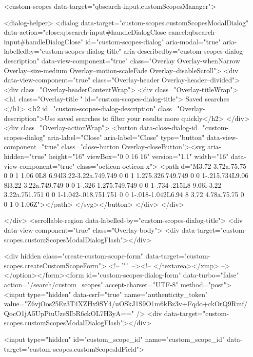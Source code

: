     <custom-scopes data-target="qbsearch-input.customScopesManager">
    
<dialog-helper>
  <dialog data-target="custom-scopes.customScopesModalDialog" data-action="close:qbsearch-input#handleDialogClose cancel:qbsearch-input#handleDialogClose" id="custom-scopes-dialog" aria-modal="true" aria-labelledby="custom-scopes-dialog-title" aria-describedby="custom-scopes-dialog-description" data-view-component="true" class="Overlay Overlay-whenNarrow Overlay--size-medium Overlay--motion-scaleFade Overlay--disableScroll">
    <div data-view-component="true" class="Overlay-header Overlay-header--divided">
  <div class="Overlay-headerContentWrap">
    <div class="Overlay-titleWrap">
      <h1 class="Overlay-title " id="custom-scopes-dialog-title">
        Saved searches
      </h1>
        <h2 id="custom-scopes-dialog-description" class="Overlay-description">Use saved searches to filter your results more quickly</h2>
    </div>
    <div class="Overlay-actionWrap">
      <button data-close-dialog-id="custom-scopes-dialog" aria-label="Close" aria-label="Close" type="button" data-view-component="true" class="close-button Overlay-closeButton"><svg aria-hidden="true" height="16" viewBox="0 0 16 16" version="1.1" width="16" data-view-component="true" class="octicon octicon-x">
    <path d="M3.72 3.72a.75.75 0 0 1 1.06 0L8 6.94l3.22-3.22a.749.749 0 0 1 1.275.326.749.749 0 0 1-.215.734L9.06 8l3.22 3.22a.749.749 0 0 1-.326 1.275.749.749 0 0 1-.734-.215L8 9.06l-3.22 3.22a.751.751 0 0 1-1.042-.018.751.751 0 0 1-.018-1.042L6.94 8 3.72 4.78a.75.75 0 0 1 0-1.06Z"></path>
</svg></button>
    </div>
  </div>
  
</div>
      <scrollable-region data-labelled-by="custom-scopes-dialog-title">
        <div data-view-component="true" class="Overlay-body">        <div data-target="custom-scopes.customScopesModalDialogFlash"></div>

        <div hidden class="create-custom-scope-form" data-target="custom-scopes.createCustomScopeForm">
        <!-- '"` --><!-- </textarea></xmp> --></option></form><form id="custom-scopes-dialog-form" data-turbo="false" action="/search/custom_scopes" accept-charset="UTF-8" method="post"><input type="hidden" data-csrf="true" name="authenticity_token" value="Z6vjOos25Ez3T4XZHx9SY4/uOSkJ1S9O1m6kBz3v+Fqdo+ckOrQ9Rmf/QocO1jA5UpPiuUzeSIbR6ckOL7H3yA==" />
          <div data-target="custom-scopes.customScopesModalDialogFlash"></div>

          <input type="hidden" id="custom_scope_id" name="custom_scope_id" data-target="custom-scopes.customScopesIdField">

